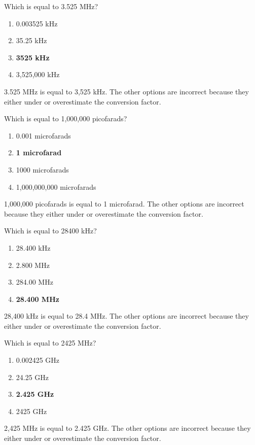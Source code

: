 \begin{tcolorbox}[colback=gray!10!white,colframe=black!75!black,title={T5B07}]
    Which is equal to 3.525 MHz?
    \begin{enumerate}[label=\Alph*),noitemsep]
        \item 0.003525 kHz
        \item 35.25 kHz
        \item \textbf{3525 kHz}
        \item 3,525,000 kHz
    \end{enumerate}
\end{tcolorbox}
3.525 MHz is equal to 3,525 kHz. The other options are incorrect because they either under or overestimate the conversion factor.

\begin{tcolorbox}[colback=gray!10!white,colframe=black!75!black,title={T5B08}]
    Which is equal to 1,000,000 picofarads?
    \begin{enumerate}[label=\Alph*),noitemsep]
        \item 0.001 microfarads
        \item \textbf{1 microfarad}
        \item 1000 microfarads
        \item 1,000,000,000 microfarads
    \end{enumerate}
\end{tcolorbox}
1,000,000 picofarads is equal to 1 microfarad. The other options are incorrect because they either under or overestimate the conversion factor.

\begin{tcolorbox}[colback=gray!10!white,colframe=black!75!black,title={T5B12}]
    Which is equal to 28400 kHz?
    \begin{enumerate}[label=\Alph*),noitemsep]
        \item 28.400 kHz
        \item 2.800 MHz
        \item 284.00 MHz
        \item \textbf{28.400 MHz}
    \end{enumerate}
\end{tcolorbox}
28,400 kHz is equal to 28.4 MHz. The other options are incorrect because they either under or overestimate the conversion factor.

\begin{tcolorbox}[colback=gray!10!white,colframe=black!75!black,title={T5B13}]
    Which is equal to 2425 MHz?
    \begin{enumerate}[label=\Alph*),noitemsep]
        \item 0.002425 GHz
        \item 24.25 GHz
        \item \textbf{2.425 GHz}
        \item 2425 GHz
    \end{enumerate}
\end{tcolorbox}
2,425 MHz is equal to 2.425 GHz. The other options are incorrect because they either under or overestimate the conversion factor.
